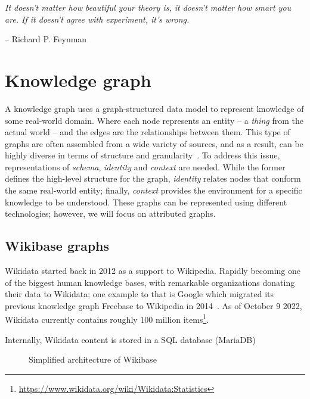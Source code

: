 \epigraph{\textit{It doesn't matter how beautiful your theory is, it doesn't matter how smart you are. If it doesn't agree with experiment, it's wrong.}}{-- \textup{Richard P. Feynman }}

\section{Knowledge graph}

A knowledge graph uses a graph-structured data model to represent knowledge of some real-world domain. Where each node represents an entity -- a \textit{thing} from the actual world -- and the edges are the relationships between them. This type of graphs are often assembled from a wide variety of sources, and as a result, can be highly diverse in terms of structure and granularity~\cite{DBLP:journals/corr/abs-2003-02320}. To address this issue, representations of \textit{schema}, \textit{identity} and \textit{context} are needed. While the former defines the high-level structure for the graph, \textit{identity} relates nodes that conform the same real-world entity; finally, \textit{context} provides the environment for a specific knowledge to be understood. These graphs can be represented using different technologies; however, we will focus on attributed graphs.

\subsection{Wikibase graphs}

Wikidata started back in 2012 as a support to Wikipedia. Rapidly becoming one of the biggest human knowledge bases, with remarkable organizations donating their data to Wikidata; one example to that is Google which migrated its previous knowledge graph Freebase to Wikipedia in 2014~\cite{10.1145/2872427.2874809}. As of October 9 2022, Wikidata currently contains roughly 100 million items\footnote{\url{https://www.wikidata.org/wiki/Wikidata:Statistics}}.

Internally, Wikidata content is stored in a SQL database (MariaDB)

\begin{figure}[h]
    \centering
    
    \caption[Simplified architecture of Wikibase]{Simplified architecture of Wikibase~\cite{https://doi.org/10.48550/arxiv.2110.11709}}
    \label{fig:architecture:wikibase}
\end{figure}

